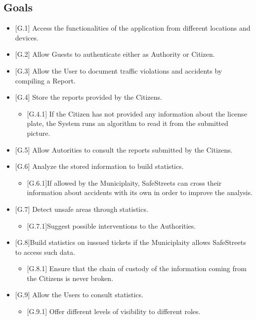 \documentclass{report}
\begin{document}
\subsection{Goals}
\begin{itemize}
    \item {[G.1]} Access the functionalities of the application from different locations and devices.
	\item {[G.2]} Allow Guests to authenticate either as Authority or Citizen.
    \item {[G.3]} Allow the User to document traffic violations and accidents by compiling a Report.
    \item {[G.4]} Store the reports provided by the Citizens.
    \begin{itemize}
    		\item {[G.4.1]} If the Citizen has not provided any information about the license plate, the System runs an algorithm to read it from the submitted picture.
		\end{itemize}     
	\item {[G.5]} Allow Autorities to consult the reports submitted by the Citizens.
    \item {[G.6]} Analyze the stored information to build statistics.
    \begin{itemize}
    		\item {[G.6.1]}If allowed by the Municiplaity, SafeStreets can cross their information about accidents with its own in order to improve the analysis.
	\end{itemize}  
	\item {[G.7]} Detect unsafe areas through statistics.
	\begin{itemize}
		\item {[G.7.1]}Suggest possible interventions to the Authorities.
	\end{itemize}
	\item{[G.8]}Build statistics on iussued tickets if the Municiplaity allows SafeStreets to access such data.
    \begin{itemize}
        \item {[G.8.1]} Ensure that the chain of custody of the information coming from the Citizens is never broken.
	\end{itemize}
	\item {[G.9]} Allow the Users to consult statistics.
	\begin{itemize}
		\item {[G.9.1]} Offer different levels of visibility to different roles.
	\end{itemize}
\end{itemize}
\end{document}
